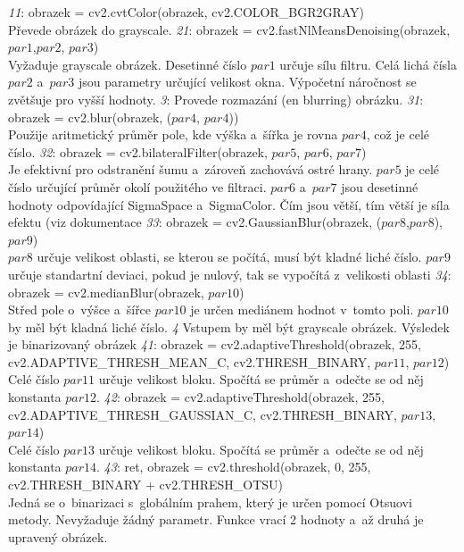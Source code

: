 \documentclass[12pt]{report}
\begin{document}
\begin{outline}
\1 \emph{11}: obrazek = cv2.cvtColor(obrazek, cv2.COLOR\_BGR2GRAY)\\ Převede obrázek do grayscale.
\1 \emph{21}: obrazek = cv2.fastNlMeansDenoising(obrazek, $par1$,$par2$, $par3$)\\
Vyžaduje grayscale obrázek. Desetinné číslo $par1$ určuje sílu filtru. Celá lichá čísla $par2$ a~$par3$ jsou parametry určující velikost okna. Výpočetní náročnost se zvětšuje pro vyšší hodnoty.
\1 \emph{3}: Provede rozmazání (\gls{en} blurring) obrázku. \parencite{CV_blur}
	\2 \emph{31}: obrazek = cv2.blur(obrazek, ($par4$, $par4$))\\ Použije aritmetický průměr pole, kde výška a~šířka je rovna $par4$, což je celé číslo.
	\2 \emph{32}: obrazek = cv2.bilateralFilter(obrazek, $par5$,  $par6$, $par7$)\\
	Je efektivní pro odstranění šumu a~zároveň zachovává ostré hrany. $par5$ je celé číslo určující průměr okolí použitého ve filtraci.	 $par6$ a~$par7$ jsou desetinné hodnoty odpovídající SigmaSpace a~SigmaColor. Čím jsou větší, tím větší je síla efektu (\gls{viz} dokumentace \parencite{CV_bilateral}
	\2 \emph{33}: obrazek = cv2.GaussianBlur(obrazek, ($par8$,$par8$), $par9$)\\  $par8$ určuje velikost oblasti, se kterou se počítá, musí být kladné liché číslo. $par9$ určuje standartní deviaci, pokud je nulový, tak se vypočítá z~velikosti oblasti
	\2 \emph{34}: obrazek = cv2.medianBlur(obrazek, $par10$) \\ Střed pole o~výšce a~šířce $par10$ je určen mediánem hodnot v~tomto poli. $par10$ by měl být kladná liché číslo.
\1 \emph{4} Vstupem by měl být grayscale obrázek.  Výsledek je binarizovaný obrázek \parencite{CV_threshold}
	\2 \emph{41}: obrazek = cv2.adaptiveThreshold(obrazek, 255,\\cv2.ADAPTIVE\_THRESH\_MEAN\_C, cv2.THRESH\_BINARY, $par11$, $par12$)\\ Celé číslo $par11$ určuje velikost bloku. Spočítá se průměr a~odečte se od něj konstanta $par12$.
	\2 \emph{42}:  obrazek = cv2.adaptiveThreshold(obrazek, 255,\\cv2.ADAPTIVE\_THRESH\_GAUSSIAN\_C, cv2.THRESH\_BINARY, $par13$, $par14$)\\ Celé číslo $par13$ určuje velikost bloku. Spočítá se průměr a~odečte se od něj konstanta $par14$.
	\2 \emph{43}: ret, obrazek = cv2.threshold(obrazek, 0, 255, cv2.THRESH\_BINARY + cv2.THRESH\_OTSU)\\
	Jedná se o~binarizaci s~globálním prahem, který je určen pomocí Otsuovi metody. Nevyžaduje žádný parametr. Funkce vrací 2 hodnoty a~až druhá je upravený obrázek.
\end{outline}
\end{document}

